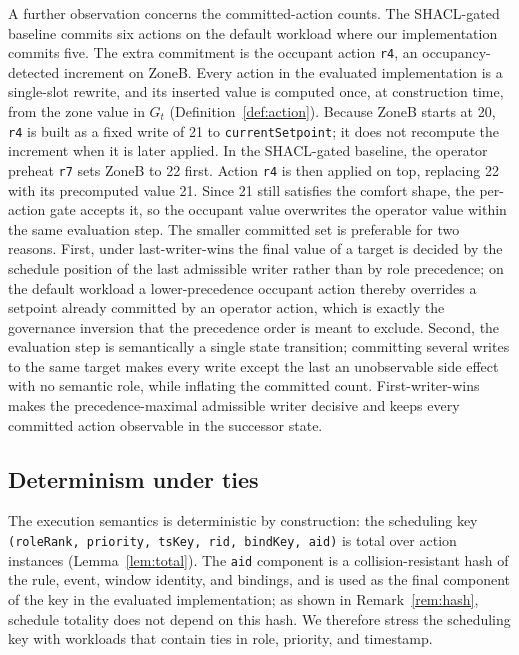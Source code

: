 \documentclass{ieeeaccess}
\theoremstyle{definition}
\theoremstyle{plain}
\theoremstyle{remark}
\begin{document}
A further observation concerns the committed-action counts. The SHACL-gated baseline commits six actions on the default workload where our implementation commits five. The extra commitment is the occupant action \texttt{r4}, an occupancy-detected increment on ZoneB. Every action in the evaluated implementation is a single-slot rewrite, and its inserted value is computed once, at construction time, from the zone value in $G_t$ (Definition~\ref{def:action}). Because ZoneB starts at 20, \texttt{r4} is built as a fixed write of 21 to \texttt{currentSetpoint}; it does not recompute the increment when it is later applied. In the SHACL-gated baseline, the operator preheat \texttt{r7} sets ZoneB to 22 first. Action \texttt{r4} is then applied on top, replacing 22 with its precomputed value 21. Since 21 still satisfies the comfort shape, the per-action gate accepts it, so the occupant value overwrites the operator value within the same evaluation step. The smaller committed set is preferable for two reasons. First, under last-writer-wins the final value of a target is decided by the schedule position of the last admissible writer rather than by role precedence; on the default workload a lower-precedence occupant action thereby overrides a setpoint already committed by an operator action, which is exactly the governance inversion that the precedence order is meant to exclude. Second, the evaluation step is semantically a single state transition; committing several writes to the same target makes every write except the last an unobservable side effect with no semantic role, while inflating the committed count. First-writer-wins makes the precedence-maximal admissible writer decisive and keeps every committed action observable in the successor state.


\subsection{Determinism under ties}
\label{sec:eval:determinism}

The execution semantics is deterministic by construction: the scheduling key \texttt{(roleRank, priority, tsKey, rid, bindKey, aid)} is total over action instances (Lemma~\ref{lem:total}). The \texttt{aid} component is a collision-resistant hash of the rule, event, window identity, and bindings, and is used as the final component of the key in the evaluated implementation; as shown in Remark~\ref{rem:hash}, schedule totality does not depend on this hash. We therefore stress the scheduling key with workloads that contain ties in role, priority, and timestamp.
\end{document}
